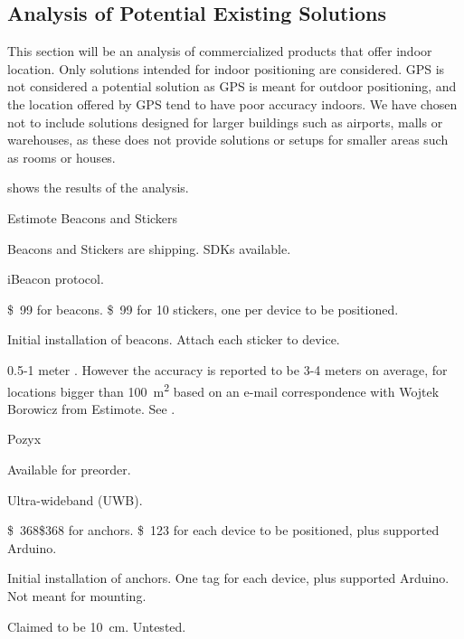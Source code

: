 \subsection{Analysis of Potential Existing Solutions}
This section will be an analysis of commercialized products that offer indoor location.
Only solutions intended for indoor positioning are considered.
GPS is not considered a potential solution as GPS is meant for outdoor positioning, 
and the location offered by GPS tend to have poor accuracy indoors.
We have chosen not to include solutions designed for larger buildings such as airports, malls or warehouses, 
as these does not provide solutions or setups for smaller areas such as rooms or houses. 

 shows the results of the analysis. 
\begin{table}[!htb]
    \begin{description}[style=multiline,leftmargin=2.5cm]
        \item[Product:] Estimote Beacons and Stickers \cite{estimote}
        \item[Availability:] Beacons and Stickers are shipping. SDKs available.
        \item[Technology:] iBeacon protocol.
        \item[Price:] \SI{99}[\$]{} for beacons. \SI{99}[\$]{} for \num{10} stickers, one per device to be positioned.
        \item[Ease of use:] Initial installation of beacons. Attach each sticker to device.
        \item[Accuracy:] \num{0.5}-\num{1} meter \cite{estimote:accuracy}. However the accuracy is reported to be \num{3}-\num{4} meters on average, for locations bigger than \SI{100}{\square\meter} based on an e-mail correspondence with Wojtek Borowicz from Estimote. See .

        \item[Product:] Pozyx \cite{pozyx}
        \item[Availability:] Available for preorder.
        \item[Technology:] Ultra-wideband (UWB).
        \item[Price:] \SI{368}[\$]{}\$368 for anchors. \SI{123}[\$]{} for each device to be positioned, plus supported Arduino.
        \item[Ease of use:] Initial installation of anchors. One tag for each device, plus supported Arduino. Not meant for mounting.
        \item[Accuracy:] Claimed to be \SI{10}{\centi\meter}. Untested. \\
        

\end{description}
\end{table}
